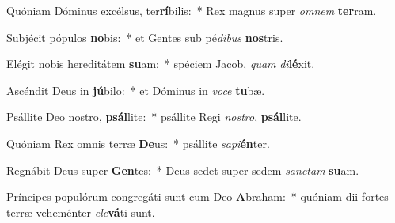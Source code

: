 \item Quóniam Dóminus excélsus, ter\textbf{rí}bilis:~* Rex magnus super \textit{om}\textit{nem} \textbf{ter}ram.
\item Subjécit pópulos \textbf{no}bis:~* et Gentes sub pé\textit{di}\textit{bus} \textbf{nos}tris.
\item Elégit nobis hereditátem \textbf{su}am:~* spéciem Jacob, \textit{quam} \textit{di}\textbf{lé}xit.
\item Ascéndit Deus in \textbf{jú}bilo:~* et Dóminus in \textit{vo}\textit{ce} \textbf{tu}bæ.
\item Psállite Deo nostro, \textbf{psál}lite:~* psállite Regi \textit{nos}\textit{tro}, \textbf{psál}lite.
\item Quóniam Rex omnis terræ \textbf{De}us:~* psállite \textit{sa}\textit{pi}\textbf{én}ter.
\item Regnábit Deus super \textbf{Gen}tes:~* Deus sedet super sedem \textit{sanc}\textit{tam} \textbf{su}am.
\item Príncipes populórum congregáti sunt cum Deo \textbf{A}braham:~* quóniam dii fortes terræ veheménter \textit{e}\textit{le}\textbf{vá}ti sunt.
